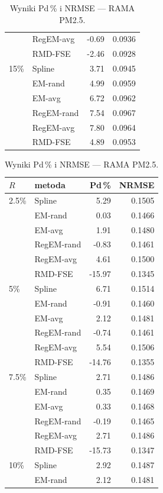 \begin{table}[htbp]
\begin{minipage}[t]{0.48\textwidth}
\begin{tabular}{llrr}
     & RegEM-avg & -0.69 & 0.0936 \\
     & RMD-FSE & -2.46 & 0.0928 \\
    \hline
    15\% & Spline & 3.71 & 0.0945 \\
     & EM-rand & 4.99 & 0.0959 \\
     & EM-avg & 6.72 & 0.0962 \\
     & RegEM-rand & 7.54 & 0.0967 \\
     & RegEM-avg & 7.80 & 0.0964 \\
     & RMD-FSE & 4.89 & 0.0953 \\
    \hline
    \end{tabular}
  \end{minipage}
  \hfill
  \begin{minipage}[t]{0.48\textwidth}
    \centering
    \caption{Wyniki Pd\,\% i NRMSE --- RAMA PM2.5.}
    \label{tab:rule02-rama}
    \begin{tabular}{llrr}
      \hline
      $R$ & metoda & Pd\,\% & NRMSE \\
      \hline
      2.5\% & Spline & 5.29 & 0.1505 \\
     & EM-rand & 0.03 & 0.1466 \\
     & EM-avg & 1.91 & 0.1480 \\
     & RegEM-rand & -0.83 & 0.1461 \\
     & RegEM-avg & 4.61 & 0.1500 \\
     & RMD-FSE & -15.97 & 0.1345 \\
    \hline
    5\% & Spline & 6.71 & 0.1514 \\
     & EM-rand & -0.91 & 0.1460 \\
     & EM-avg & 2.12 & 0.1481 \\
     & RegEM-rand & -0.74 & 0.1461 \\
     & RegEM-avg & 5.54 & 0.1506 \\
     & RMD-FSE & -14.76 & 0.1355 \\
    \hline
    7.5\% & Spline & 2.71 & 0.1486 \\
     & EM-rand & 0.35 & 0.1469 \\
     & EM-avg & 0.33 & 0.1468 \\
     & RegEM-rand & -0.19 & 0.1465 \\
     & RegEM-avg & 2.71 & 0.1486 \\
     & RMD-FSE & -15.73 & 0.1347\\
    \hline
    10\% & Spline & 2.92 & 0.1487 \\
     & EM-rand & 2.12 & 0.1481 \\

\end{tabular}
\end{minipage}
\end{table}
